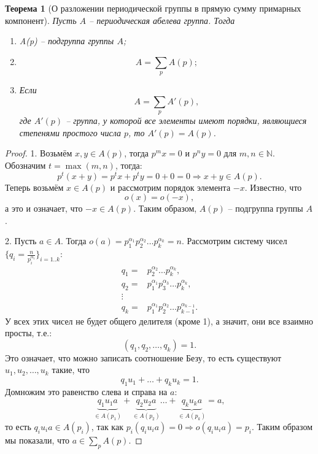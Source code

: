 \documentclass{article}
\newtheorem{theorem}{Теорема}[section]
\begin{document}
\begin{theorem}[О разложении периодической группы в прямую сумму примарных компонент] \label{fiona}
    Пусть $A$ -- периодическая абелева группа. Тогда
    \begin{enumerate}
        \item A(p) -- подгруппа группы $A$;
        \item $$ A = \sum_p A(p); $$
        \item Если $$ A = \sum_p A'(p), $$ где $A'(p)$ -- группа, у которой все элементы имеют порядки, являющиеся степенями простого числа $p$, то $A'(p) = A(p)$.
    \end{enumerate}
\end{theorem}
\begin{proof}
    1. Возьмём $x, y \in A(p)$, тогда $p^m x = 0$ и $p^n y = 0$ для $m, n \in \mathbb{N}$. Обозначим $t = \max (m, n)$, тогда:
    $$ p^t (x + y) = p^t x + p^t y = 0 + 0 = 0 \Rightarrow x + y \in A(p). $$
    Теперь возьмём $x \in A(p)$ и рассмотрим порядок элемента $-x$. Известно, что $$ o(x) = o(-x), $$ а это и означает, что $-x \in A(p)$. Таким образом, $A(p)$ -- подгруппа группы $A$.

    2. Пусть $a \in A$. Тогда $o(a) = p_1^{\alpha_1} p_2^{\alpha_2} \ldots p_k^{\alpha_k} = n$.
    Рассмотрим систему чисел $\{ q_i = \frac{n}{p_i^{\alpha_i}} \}_{i = 1..k}$:
    \begin{align*}
        q_1 =& p_2^{\alpha_2} \ldots p_k^{\alpha_k}, \\
        q_2 =& p_1^{\alpha_1} p_3^{\alpha_3} \ldots p_k^{\alpha_k}, \\
        \vdots & \\
        q_k =& p_1^{\alpha_1} p_2^{\alpha_2} \ldots p_{k - 1}^{\alpha_{k - 1}}.
    \end{align*}
    У всех этих чисел не будет общего делителя (кроме 1), а значит, они все взаимно просты, т.е.:
    $$ (q_1, q_2, \ldots, q_k) = 1. $$
    Это означает, что можно записать соотношение Безу, то есть существуют $u_1, u_2, \ldots, u_k$ такие, что
    $$ q_1 u_1 + \ldots + q_k u_k = 1. $$ Домножим это равенство слева и справа на $a$:
    \[
        \underbrace{q_1 u_1 a}_{\in A(p_1)} + \underbrace{q_2 u_2 a}_{\in A(p_2)} \ldots + \underbrace{q_k u_k a}_{\in A(p_k)} = a,
    \]
    то есть $q_i u_i a \in A(p_i)$, так как $p_i (q_i u_i a) = 0 \Rightarrow o(q_i u_i a) = p_i$. Таким образом мы показали, что $a \in \sum_p A(p)$.
    

\end{proof}
\end{document}
